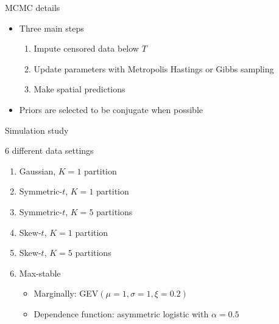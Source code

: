 \documentclass{beamer}
\begin{document}



\begin{frame}{MCMC details}
  \begin{itemize} \setlength{\itemsep}{1em}
    \item Three main steps \vspace{0.5em}
    \begin{enumerate}[1.] \setlength{\itemsep}{0.5em}
      \item Impute censored data below $T$
      \item Update parameters with Metropolis Hastings or Gibbs sampling
      \item Make spatial predictions
    \end{enumerate}
    \item Priors are selected to be conjugate when possible
  \end{itemize}
\end{frame}

\begin{frame}{Simulation study}
\begin{adjustwidth}{1em}{0em}
  6 different data settings \vspace{0.5em}
  \begin{enumerate}[1.] \setlength{\itemsep}{0.5em}
    \item Gaussian, $K = 1$ partition
    \item Symmetric-$t$, $K = 1$ partition
    \item Symmetric-$t$, $K = 5$ partitions
    \item Skew-$t$, $K = 1$ partition
    \item Skew-$t$, $K = 5$ partitions
    \item Max-stable \vspace{0.25em}
    \begin{itemize} \setlength{\itemsep}{0.25em}
      \item Marginally: GEV$(\mu=1, \sigma=1, \xi=0.2)$
      \item Dependence function: asymmetric logistic with $\alpha = 0.5$
    \end{itemize}
  \end{enumerate}
\end{adjustwidth}
\end{frame}
\end{document}
